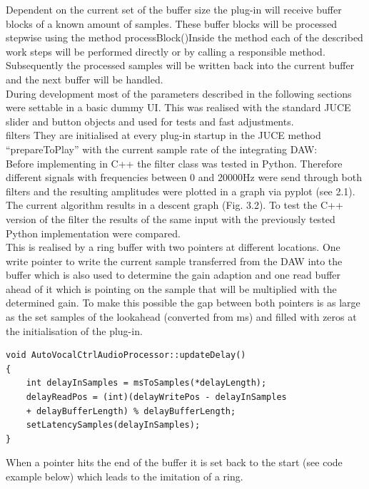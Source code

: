 Dependent on the current set of the buffer size the plug-in will receive buffer blocks of a known amount of samples. These buffer blocks will be processed stepwise using the method processBlock()Inside the method each of the described work steps will be performed directly or by calling a responsible method. Subsequently the processed samples will be written back into the current buffer and the next buffer will be handled.\\

During development most of the parameters described in the following sections were settable in a basic dummy UI. This was realised with the standard JUCE slider and button objects and used for tests and fast adjustments.\\

filters
 They are initialised at every plug-in startup in the JUCE method “prepareToPlay” with the current sample rate of the integrating DAW:\\
 
 Before implementing in C++ the filter class was tested in Python. Therefore different signals with frequencies between 0 and 20000Hz were send through both filters and the resulting amplitudes were plotted in a graph via pyplot (see 2.1). The current algorithm results in a descent graph (Fig. 3.2). To test the C++ version of the filter the results of the same input with the previously tested Python implementation were compared.\\
 
 This is realised by a ring buffer with two pointers at different locations. One write pointer to write the current sample transferred from the DAW into the buffer which is also used to determine the gain adaption and one read buffer ahead of it which is pointing on the sample that will be multiplied with the determined gain. To make this possible the gap between both pointers is as large as the set samples of the lookahead (converted from ms) and filled with zeros at the initialisation of the plug-in.\\

\begin{lstlisting}[frame=single]
void AutoVocalCtrlAudioProcessor::updateDelay()
{
    int delayInSamples = msToSamples(*delayLength);
    delayReadPos = (int)(delayWritePos - delayInSamples
    + delayBufferLength) % delayBufferLength;
    setLatencySamples(delayInSamples);
}
\end{lstlisting}

When a pointer hits the end of the buffer it is set back to the start (see code example below) which leads to the imitation of a ring.\\

